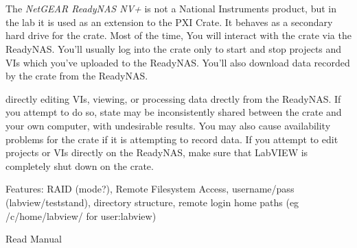 \section{}
\label{sec:eq_readynas}

The \textit{NetGEAR ReadyNAS NV+}%
is not a National Instruments product, but in the lab it is used as an extension to the \gls{PXI Crate}.  It behaves as a secondary hard drive for the crate.  Most of the time, You will interact with the crate via the \gls{ReadyNAS}.  You'll usually log into the crate only to start and stop projects and VIs which you've uploaded to the \gls{ReadyNAS}.  You'll also download data recorded by the crate from the \gls{ReadyNAS}.

\begin{avoid} directly editing VIs, viewing, or processing data drectly from the \gls{ReadyNAS}.  If you attempt to do so, state may be inconsistently shared between the crate and your own computer, with undesirable results.  You may also cause availability problems for the crate if it is attempting to record data.  If you attempt to edit projects or VIs directly on the \gls{ReadyNAS}, make sure that LabVIEW is completely shut down on the crate.
\end{avoid}

\FIXME{} Features: RAID (mode?), Remote Filesystem Access, username/pass (labview/teststand), directory structure, remote login home paths (eg /c/home/labview/ for user:labview)

\FIXME{} Read Manual


